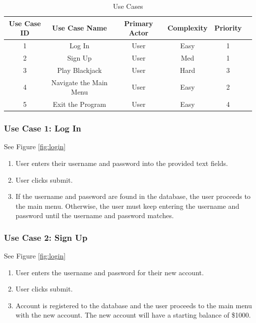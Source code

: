 \documentclass[10pt,conference,onecolumn,compsoc]{IEEEtran}
\begin{document}
\begin{table}
\centering
\begin{tabular}{|c|c|c|c|c|c|}
\hline
Use Case ID & Use Case Name & Primary Actor & Complexity & Priority \\
\hline \hline
1 & Log In & User & Easy & 1\\
\hline
2 & Sign Up & User & Med & 1\\
\hline
3 & Play Blackjack & User & Hard & 3\\
\hline
4 & Navigate the Main Menu & User & Easy & 2\\
\hline
5 & Exit the Program & User & Easy & 4\\
\hline
\end{tabular}
\caption{Use Cases}
\label{tab:useCaseIndex}
\end{table}

\subsubsection{Use Case 1: Log In}
See Figure \ref{fig:login}
\begin{enumerate}
\item User enters their username and password into the provided text fields.
\item User clicks submit.
\item If the username and password are found in the database, the user proceeds to the main menu. Otherwise, the user must keep entering the username and password until the username and password matches.
\end{enumerate}

\subsubsection{Use Case 2: Sign Up}
See Figure \ref{fig:login}
\begin{enumerate}
\item User enters the username and password for their new account.
\item User clicks submit.
\item Account is registered to the database and the user proceeds to the main menu with the new account. The new account will have a starting balance of \$1000.
\end{enumerate}
\end{document}
